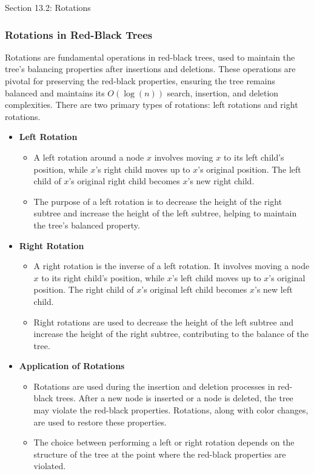 \begin{notes}{Section 13.2: Rotations}
    \subsubsection*{Rotations in Red-Black Trees}

    Rotations are fundamental operations in red-black trees, used to maintain the tree's balancing properties after insertions and deletions. These operations are pivotal for preserving the red-black 
    properties, ensuring the tree remains balanced and maintains its $O(\log{(n)})$ search, insertion, and deletion complexities. There are two primary types of rotations: left rotations and right rotations.
    
    \begin{itemize}
        \item \textbf{Left Rotation}
        \begin{itemize}
            \item A left rotation around a node $x$ involves moving $x$ to its left child's position, while $x$'s right child moves up to $x$'s original position. The left child of $x$'s original right 
            child becomes $x$'s new right child.
            \item The purpose of a left rotation is to decrease the height of the right subtree and increase the height of the left subtree, helping to maintain the tree's balanced property.
        \end{itemize}
        
        \item \textbf{Right Rotation}
        \begin{itemize}
            \item A right rotation is the inverse of a left rotation. It involves moving a node $x$ to its right child's position, while $x$'s left child moves up to $x$'s original position. The right 
            child of $x$'s original left child becomes $x$'s new left child.
            \item Right rotations are used to decrease the height of the left subtree and increase the height of the right subtree, contributing to the balance of the tree.
        \end{itemize}
        
        \item \textbf{Application of Rotations}
        \begin{itemize}
            \item Rotations are used during the insertion and deletion processes in red-black trees. After a new node is inserted or a node is deleted, the tree may violate the red-black properties. 
            Rotations, along with color changes, are used to restore these properties.
            \item The choice between performing a left or right rotation depends on the structure of the tree at the point where the red-black properties are violated.
        \end{itemize}
        

\end{itemize}
\end{notes}
